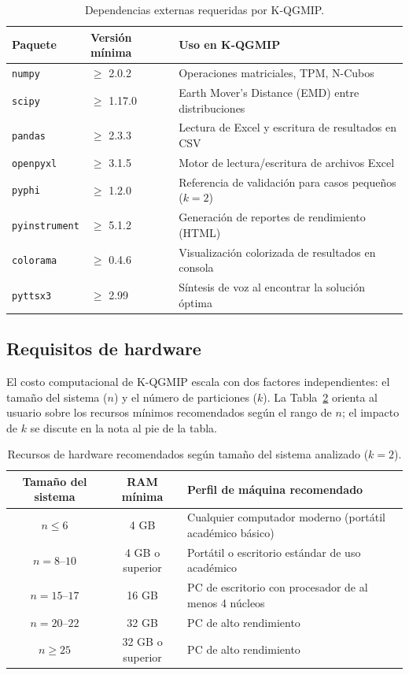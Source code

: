\begin{table}[h!]
\centering
\begin{tabular}{|l|l|p{7cm}|}
\hline
\textbf{Paquete} & \textbf{Versión mínima} & \textbf{Uso en K-QGMIP} \\
\hline
\texttt{numpy}        & $\geq$ 2.0.2  & Operaciones matriciales, TPM, N-Cubos \\
\texttt{scipy}        & $\geq$ 1.17.0 & Earth Mover's Distance (EMD) entre distribuciones \\
\texttt{pandas}       & $\geq$ 2.3.3  & Lectura de Excel y escritura de resultados en CSV \\
\texttt{openpyxl}     & $\geq$ 3.1.5  & Motor de lectura/escritura de archivos Excel \\
\texttt{pyphi}        & $\geq$ 1.2.0  & Referencia de validación para casos pequeños ($k=2$) \\
\texttt{pyinstrument} & $\geq$ 5.1.2  & Generación de reportes de rendimiento (HTML) \\
\texttt{colorama}     & $\geq$ 0.4.6  & Visualización colorizada de resultados en consola \\
\texttt{pyttsx3}      & $\geq$ 2.99   & Síntesis de voz al encontrar la solución óptima \\
\hline
\end{tabular}
\caption{Dependencias externas requeridas por K-QGMIP.}
\label{tab:dependencias}
\end{table}

\subsection{Requisitos de hardware}

El costo computacional de K-QGMIP escala con dos factores independientes: el tamaño del
sistema ($n$) y el número de particiones ($k$). La Tabla~\ref{tab:hardware} orienta al
usuario sobre los recursos mínimos recomendados según el rango de $n$; el impacto de $k$
se discute en la nota al pie de la tabla.

\begin{table}[h!]
\centering
\begin{tabular}{|c|c|p{7.5cm}|}
\hline
\textbf{Tamaño del sistema} & \textbf{RAM mínima} & \textbf{Perfil de máquina recomendado} \\
\hline
$n \leq 6$    & 4 GB  & Cualquier computador moderno (portátil académico básico) \\
$n = 8$--$10$ & 4 GB o superior & Portátil o escritorio estándar de uso académico \\
$n = 15$--$17$ & 16 GB & PC de escritorio con procesador de al menos 4 núcleos \\
$n = 20$--$22$ & 32 GB & PC de alto rendimiento \\
$n \geq 25$   &  32 GB o superior & PC de alto rendimiento \\
\hline
\end{tabular}
\caption{Recursos de hardware recomendados según tamaño del sistema analizado ($k=2$).}
\label{tab:hardware}
\end{table}

